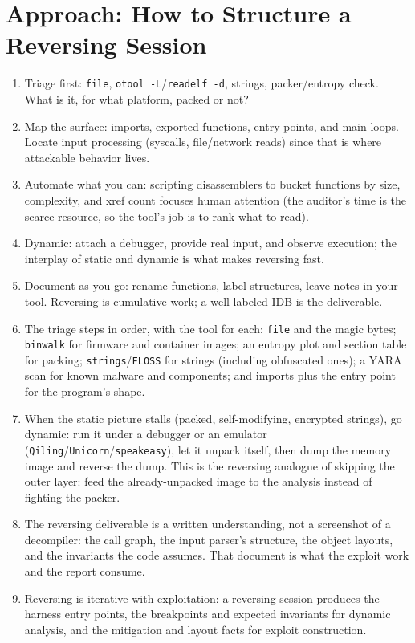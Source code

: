 \documentclass[12pt]{Training}
\begin{document}
\section*{Approach: How to Structure a Reversing Session}
\begin{enumerate}
    \item Triage first: \lstinline{file}, \lstinline{otool -L}/\lstinline{readelf -d}, strings, packer/entropy check. What is it, for what platform, packed or not?
    \item Map the surface: imports, exported functions, entry points, and main loops. Locate input processing (syscalls, file/network reads) since that is where attackable behavior lives.
    \item Automate what you can: scripting disassemblers to bucket functions by size, complexity, and xref count focuses human attention (the auditor's time is the scarce resource, so the tool's job is to rank what to read).
    \item Dynamic: attach a debugger, provide real input, and observe execution; the interplay of static and dynamic is what makes reversing fast.
    \item Document as you go: rename functions, label structures, leave notes in your tool. Reversing is cumulative work; a well-labeled IDB is the deliverable.
    \item The triage steps in order, with the tool for each: \lstinline{file} and the magic bytes; \lstinline{binwalk} for firmware and container images; an entropy plot and section table for packing; \lstinline{strings}/\lstinline{FLOSS} for strings (including obfuscated ones); a YARA scan for known malware and components; and imports plus the entry point for the program's shape.
    \item When the static picture stalls (packed, self-modifying, encrypted strings), go dynamic: run it under a debugger or an emulator (\lstinline{Qiling}/\lstinline{Unicorn}/\lstinline{speakeasy}), let it unpack itself, then dump the memory image and reverse the dump. This is the reversing analogue of skipping the outer layer: feed the already-unpacked image to the analysis instead of fighting the packer.
    \item The reversing deliverable is a written understanding, not a screenshot of a decompiler: the call graph, the input parser's structure, the object layouts, and the invariants the code assumes. That document is what the exploit work and the report consume.
    \item Reversing is iterative with exploitation: a reversing session produces the harness entry points, the breakpoints and expected invariants for dynamic analysis, and the mitigation and layout facts for exploit construction.
\end{enumerate}
\end{document}
